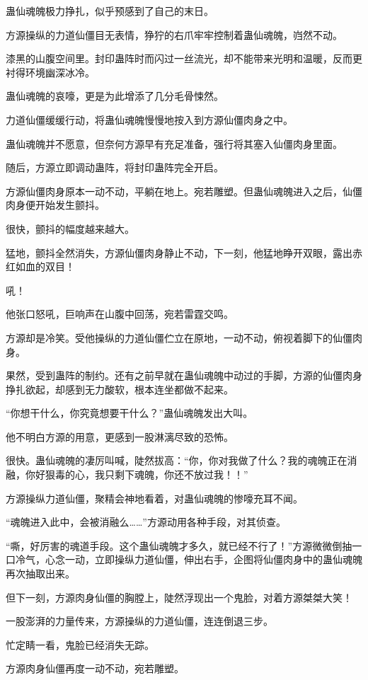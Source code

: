 \begin{this_body}
蛊仙魂魄极力挣扎，似乎预感到了自己的末日。

方源操纵的力道仙僵目无表情，狰狞的右爪牢牢控制着蛊仙魂魄，岿然不动。

漆黑的山腹空间里。封印蛊阵时而闪过一丝流光，却不能带来光明和温暖，反而更衬得环境幽深冰冷。

蛊仙魂魄的哀嚎，更是为此增添了几分毛骨悚然。

力道仙僵缓缓行动，将蛊仙魂魄慢慢地按入到方源仙僵肉身之中。

蛊仙魂魄并不愿意，但奈何方源早有充足准备，强行将其塞入仙僵肉身里面。

随后，方源立即调动蛊阵，将封印蛊阵完全开启。

方源仙僵肉身原本一动不动，平躺在地上。宛若雕塑。但蛊仙魂魄进入之后，仙僵肉身便开始发生颤抖。

很快，颤抖的幅度越来越大。

猛地，颤抖全然消失，方源仙僵肉身静止不动，下一刻，他猛地睁开双眼，露出赤红如血的双目！

吼！

他张口怒吼，巨响声在山腹中回荡，宛若雷霆交鸣。

方源却是冷笑。受他操纵的力道仙僵伫立在原地，一动不动，俯视着脚下的仙僵肉身。

果然，受到蛊阵的制约。还有之前早就在蛊仙魂魄中动过的手脚，方源的仙僵肉身挣扎欲起，却感到无力酸软，根本连坐都做不起来。

“你想干什么，你究竟想要干什么？”蛊仙魂魄发出大叫。

他不明白方源的用意，更感到一股淋漓尽致的恐怖。

很快。蛊仙魂魄的凄厉叫喊，陡然拔高：“你，你对我做了什么？我的魂魄正在消融，你好狠毒的心，我只剩下魂魄，你还不放过我！！”

方源操纵力道仙僵，聚精会神地看着，对蛊仙魂魄的惨嚎充耳不闻。

“魂魄进入此中，会被消融么……”方源动用各种手段，对其侦查。

“嘶，好厉害的魂道手段。这个蛊仙魂魄才多久，就已经不行了！”方源微微倒抽一口冷气，心念一动，立即操纵力道仙僵，伸出右手，企图将仙僵肉身中的蛊仙魂魄再次抽取出来。

但下一刻，方源肉身仙僵的胸膛上，陡然浮现出一个鬼脸，对着方源桀桀大笑！

一股澎湃的力量传来，方源操纵的力道仙僵，连连倒退三步。

忙定睛一看，鬼脸已经消失无踪。

方源肉身仙僵再度一动不动，宛若雕塑。


\end{this_body}
